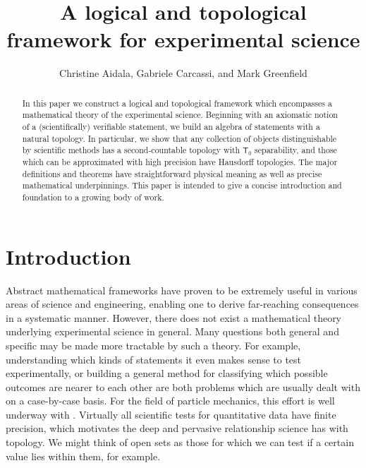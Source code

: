 \documentclass[psamsfonts]{amsart}
\title{A logical and topological framework for experimental science}
\author{Christine Aidala, Gabriele Carcassi, and Mark Greenfield}
\date{}
\theoremstyle{definition}
\theoremstyle{remark}
\numberwithin{equation}{section}
\begin{document}
\begin{abstract}
In this paper we construct a logical and topological framework which encompasses a mathematical theory of the experimental science. Beginning with an axiomatic notion of a (scientifically) verifiable statement, we build an algebra of statements with a natural topology. In particular, we show that any collection of objects distinguishable by scientific methods has a second-countable topology with $\mathsf{T}_0$ separability, and those which can be approximated with high precision have Hausdorff topologies. The major definitions and theorems have straightforward physical meaning as well as precise mathematical underpinnings. This paper is intended to give a concise introduction and foundation to a growing body of work. 
\end{abstract}

\maketitle


\section{Introduction}
Abstract mathematical frameworks have proven to be extremely useful in various areas of science and engineering, enabling one to derive far-reaching consequences in a systematic manner. However, there does not exist a mathematical theory underlying experimental science in general. Many questions both general and specific may be made more tractable by such a theory. For example, understanding which kinds of statements it even makes sense to test experimentally, or building a general method for classifying which possible outcomes are nearer to each other are both problems which are usually dealt with on a case-by-case basis. For the field of particle mechanics, this effort is well underway with \cite{carc1}. Virtually all scientific tests for quantitative data have finite precision, which motivates the deep and pervasive relationship science has with topology. We might think of open sets as those for which we can test if a certain value lies within them, for example. 
\end{document}
